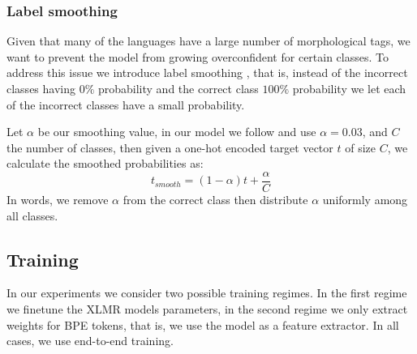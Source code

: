 \documentclass[11pt]{article}
\newcommand\citep{\cite}
\begin{document}
	\subsubsection{Label smoothing}
    	Given that many of the languages have a large number of
     morphological tags, we want to prevent the model from growing
     overconfident for certain classes. To address this issue we
     introduce label smoothing \cite{szegedy2016rethinking}, that is,
     instead of the incorrect classes having $0\%$ probability and the
     correct class $100\%$ probability we let each of the incorrect
     classes have a small probability.

         Let $\alpha$ be our smoothing value, in our model we follow
     \citep{kondratyukstraka} and use $\alpha = 0.03$, and $C$ the
     number of classes, then given a one-hot encoded target vector $t$
     of size $C$, we calculate the smoothed probabilities as:
    \begin{equation}
        t_{smooth} = (1-\alpha)t + \frac{\alpha}{C}
    \end{equation}
    In words, we remove $\alpha$ from the correct class then
    distribute $\alpha$ uniformly among all classes.
     \subsection{Training}

     In our experiments we consider two possible training regimes. In
     the first regime we finetune the XLMR models parameters, in the
     second regime we only extract weights for BPE tokens, that is, we
     use the model as a feature extractor. In all cases, we use
     end-to-end training.
\end{document}
